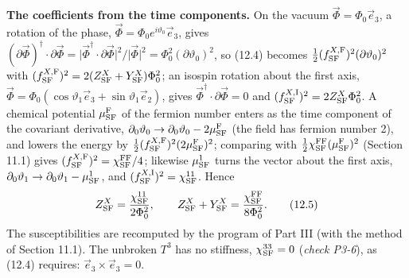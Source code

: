 \documentclass[
  10pt,
]{article}
\begin{document}
\textbf{The coefficients from the time components.} On the vacuum
\(\vec\Phi=\Phi_0\vec e_3\), a rotation of the phase,
\(\vec\Phi=\Phi_0e^{i\vartheta_0}\vec e_3\), gives
\((\partial\vec\Phi)^\dagger\cdot\partial\vec\Phi=\lvert\vec\Phi^\dagger\cdot\partial\vec\Phi\rvert^2/\lvert\vec\Phi\rvert^2=\Phi_0^2(\partial\vartheta_0)^2\),
so (12.4) becomes
\(\tfrac12(f^{X,{\rm F}}_{\rm SF})^2(\partial\vartheta_0)^2\) with
\((f^{X,{\rm F}}_{\rm SF})^2=2(Z^X_{\rm SF}+Y^X_{\rm SF})\Phi_0^2\); an
isospin rotation about the first axis,
\(\vec\Phi=\Phi_0(\cos\vartheta_1\vec e_3+\sin\vartheta_1\vec e_2)\),
gives \(\vec\Phi^\dagger\cdot\partial\vec\Phi=0\) and
\((f^{X,{\rm I}}_{\rm SF})^2=2Z^X_{\rm SF}\Phi_0^2\). A chemical
potential \(\mu^{\rm F}_{\rm SF}\) of the fermion number enters as the
time component of the covariant derivative,
\(\partial_0\vartheta_0\to\partial_0\vartheta_0-2\mu^{\rm F}_{\rm SF}\)
(the field has fermion number 2), and lowers the energy by
\(\tfrac12(f^{X,{\rm F}}_{\rm SF})^2(2\mu^{\rm F}_{\rm SF})^2\);
comparing with
\(\tfrac12\chi^{\rm FF}_{\rm SF}(\mu^{\rm F}_{\rm SF})^2\) (Section
11.1) gives \((f^{X,{\rm F}}_{\rm SF})^2=\chi^{\rm FF}_{\rm SF}/4\);
likewise \(\mu^1_{\rm SF}\) turns the vector about the first axis,
\(\partial_0\vartheta_1\to\partial_0\vartheta_1-\mu^1_{\rm SF}\), and
\((f^{X,{\rm I}}_{\rm SF})^2=\chi^{11}_{\rm SF}\). Hence
\[Z^X_{\rm SF}=\frac{\chi^{11}_{\rm SF}}{2\Phi_0^2},\qquad Z^X_{\rm SF}+Y^X_{\rm SF}=\frac{\chi^{\rm FF}_{\rm SF}}{8\Phi_0^2}.\tag{12.5}\]
The susceptibilities are recomputed by the program of Part III (with the
method of Section 11.1). The unbroken \(T^3\) has no stiffness,
\(\chi^{33}_{\rm SF}=0\) (\emph{check P3-6}), as (12.4) requires:
\(\vec e_3\times\vec e_3=0\).
\end{document}
